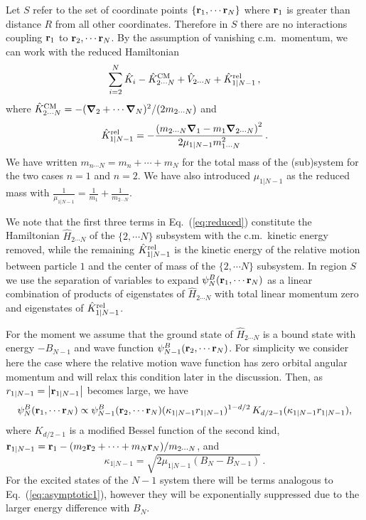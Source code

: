 \documentclass[aps,singlecolumn,superscriptaddress,nofootinbib,tightenlines,
preprintnumbers,showkeys]{revtex4-1}
\newcommand{\vNabla}{\boldsymbol{\nabla}}
\newcommand{\abs}[1]{\left|#1\right|}
\begin{document}
Let $S$ refer to the set of coordinate points $\{ {\bf r}_1,\cdots{\bf r}_N
\}$ where ${\bf r}_1$ is greater than distance $R$ from all other coordinates.
Therefore in $S$ there are no interactions coupling ${\bf r}_1$ to
${\bf r}_2,\cdots{\bf r}_N$.  By the assumption of vanishing c.m.\ momentum, we 
can work with the reduced Hamiltonian
%
\begin{equation}
 \sum_{i=2}^{N} \hat{K}_i - \hat{K}^{\rm CM}_{2\cdots N}
 + \hat{V}_{2\cdots N} + \hat{K}^{\rm rel}_{1|N-1} \,,
\label{eq:reduced}
\end{equation}
%
where $\hat{K}^{\rm CM}_{2\cdots N}
= -({\vNabla}_2+\cdots{\vNabla}_{N})^2/(2m_{2 \cdots N})$ and
%
\begin{equation}
\hat{K}^{\rm rel}_{1|N-1}
 = {-}\frac{\left(m_{2\cdots N}{\vNabla}_1 - m_1{\vNabla}_{2\cdots N}\right)^2}
 {2\mu_{1|N-1}m^2_{1\cdots N}} \,.
\end{equation}
%
We have written $m_{n\cdots N} = m_n+\cdots+m_{N}$ for the total mass of the 
(sub)system for the two cases $n=1$ and $n=2$.  We have also introduced 
$\mu_{1|N-1}$ as the reduced mass with $\tfrac{1}{\mu_{1|N-1}} = 
\tfrac{1}{m_1}+\tfrac{1}{m_{2\cdots N}}$.

We note that the first three terms in Eq.~(\ref{eq:reduced}) constitute the 
Hamiltonian $\hat{H}_{2\cdots N}$ of the ${\{2,\cdots N\}}$ subsystem with the 
c.m.\ kinetic energy removed, while the remaining $\hat{K}^{\rm rel}_{1|N-1}$ 
is the kinetic energy of the relative motion between particle $1$ and the
center of mass of the ${\{2,\cdots N\}}$ subsystem.  In region $S$ we use the 
separation of variables to expand $\psi^B_N({\bf r}_1,\cdots {\bf r}_N)$ as a 
linear combination of products of eigenstates of $\hat{H}_{2\cdots N}$ with 
total linear momentum zero and eigenstates of $\hat{K}^{\rm rel}_{1|N-1}$.

For the moment we assume that the ground state of $\hat{H}_{2\cdots N}$ is a
bound state with energy ${-}B_{N-1}$ and wave function
$\psi^B_{N-1}({\bf r}_2,\cdots{\bf r}_{N})$.  For simplicity we consider here
the case where the relative motion wave function has zero orbital angular 
momentum and will relax this condition later in the discussion.  Then, as 
$r_{1|N-1}=\abs{{\bf r}_{1|N-1}}$ becomes large, we have
%
\begin{equation}
 \psi^B_N({\bf r}_1,\cdots{\bf r}_N)
 \propto \psi^B_{N-1}({\bf r}_2,\cdots{\bf r}_{N})
 \null (\kappa_{1|N-1}r_{1|N-1})^{1-d/2} \,
 K_{d/2-1}(\kappa_{1|N-1}r_{1|N-1}),
\label{eq:asymptotic1}
\end{equation}
%
where $K_{d/2-1}$ is a modified Bessel function of the second kind,
${\bf r}_{1|N-1} = {\bf r}_1
- (m_2{\bf r}_2+\cdots+m_{N}{\bf r}_{N})/{m_{2\cdots N}}$, and
%
\begin{equation}
 \kappa_{1|N-1} = \sqrt{2\mu_{1|N-1}(B_{N}-B_{N-1})} \,.
\label{eq:1|N-1}
\end{equation}
%
For the excited states of the $N{-}1$ system there will be terms analogous
to Eq.~(\ref{eq:asymptotic1}), however they will be exponentially suppressed 
due to the larger energy difference with $B_{N}$.
\end{document}
